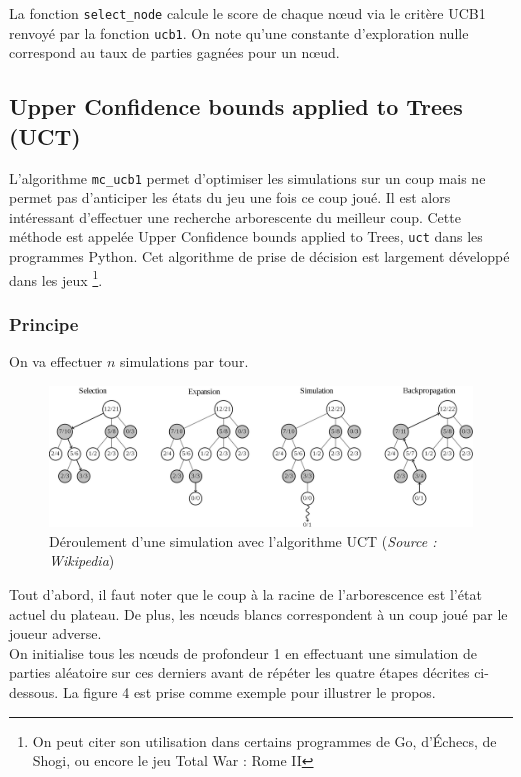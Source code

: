 \documentclass[a4paper]{article}
\theoremstyle{definition}
\begin{document}
La fonction \texttt{select\_node} calcule le score de chaque nœud via le critère UCB1 renvoyé par la fonction \texttt{ucb1}. On note qu'une constante d'exploration nulle correspond au taux de parties gagnées pour un nœud.

\subsection{Upper Confidence bounds applied to Trees (UCT)}

L'algorithme \texttt{mc\_ucb1} permet d'optimiser les simulations sur un coup mais ne permet pas d'anticiper les états du jeu une fois ce coup joué. Il est alors intéressant d'effectuer une recherche arborescente du meilleur coup. Cette méthode est appelée Upper Confidence bounds applied to Trees, \texttt{uct} dans les programmes Python. Cet algorithme de prise de décision est largement développé dans les jeux \footnote{On peut citer son utilisation dans certains programmes de Go, d'Échecs, de Shogi, ou encore le jeu Total War : Rome II}.

\subsubsection{Principe}

On va effectuer $n$ simulations par tour.
\begin{figure}[h]
\centering
\includegraphics[scale=0.18]{MCTS_wikipedia.png}
\caption{Déroulement d'une simulation avec l'algorithme UCT (\textit{Source : Wikipedia})}
\label{fig:uct}
\end{figure}

Tout d'abord, il faut noter que le coup à la racine de l'arborescence est l'état actuel du plateau. De plus, les nœuds blancs correspondent à un coup joué par le joueur adverse.\\
On initialise tous les nœuds de profondeur 1 en effectuant une simulation de parties aléatoire sur ces derniers avant de répéter les quatre étapes décrites ci-dessous. La figure 4 est prise comme exemple pour illustrer le propos.\\
\end{document}

